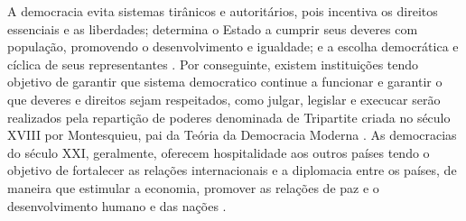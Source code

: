 A democracia evita sistemas tirânicos e autoritários, pois incentiva os direitos essenciais e as liberdades; determina o Estado a cumprir seus deveres com população, promovendo o desenvolvimento e igualdade; e a escolha democrática e cíclica de seus representantes \cite{robertdahl2001}.
Por conseguinte, existem instituições tendo objetivo de garantir que sistema democratico continue a funcionar e garantir o que deveres e direitos sejam respeitados, como julgar, legislar e execucar serão realizados pela repartição de poderes denominada de Tripartite criada no século XVIII por Montesquieu, pai da Teória da Democracia Moderna \cite{bobbio1998dicionario, matias2014curso}.
As democracias do século XXI, geralmente, oferecem hospitalidade aos outros países tendo o objetivo de fortalecer as relações internacionais e a diplomacia entre os países, de maneira que estimular a economia, promover as relações de paz e o desenvolvimento humano e das nações \cite{robertdahl2001}.

